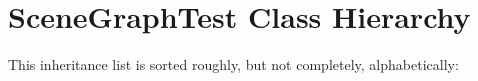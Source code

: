 \section{SceneGraphTest Class Hierarchy}
This inheritance list is sorted roughly, but not completely, alphabetically:\begin{CompactList}
\item {}
\item {}
\item {}
\begin{CompactList}
\item {}
\end{CompactList}
\end{CompactList}
